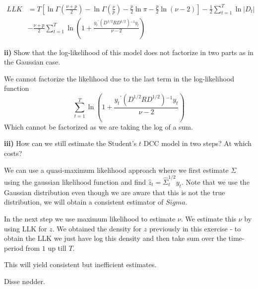 \documentclass{article}
\begin{document}
\begin{align*}
    LLK&=T\left[\ln\Gamma\left(\frac{\nu+p}{2}\right)-\ln\Gamma\left(\frac{\nu}{p}\right)-\frac{p}{2}\ln\pi-\frac{p}{2}\ln\left(\nu-2\right)\right]-\frac{1}{2}\sum_{t=1}^{T}\ln\left|D_{t}\right|\\
	&-\frac{\nu+p}{2}\sum_{t=1}^{T}\ln\left(1+\frac{y_{t}{}^{\prime}\left(D^{1/2}RD^{1/2}\right){}^{-1}y_{t}}{\nu-2}\right)
\end{align*}

\begin{tcolorbox}[colback=white]
	\textbf{ii)} Show that the log-likelihood of this model does not factorize in two parts as in the Gaussian case.
\end{tcolorbox}
We cannot factorize the likelihood due to the last term in the log-likelihood function 
$$\sum_{t=1}^{T}\ln\left(1+\frac{y_{t}{}^{\prime}\left(D^{1/2}RD^{1/2}\right){}^{-1}y_{t}}{\nu-2}\right)$$ Which cannot be factorized as we are taking the log of a sum.


\begin{tcolorbox}[colback=white]
	\textbf{iii)} How can we still estimate the Student's $t$ DCC model in two steps? At which costs? 
\end{tcolorbox}

We can use a quasi-maximum likelihood approach where we first estimate $\Sigma$ using 
the gaussian likelihood function and find $\widehat{z}_{t}=\widehat{\Sigma}_{t}^{1/2}y_{t}$. 
Note that we use the Gaussian distribution even though we are aware that this is not the true distribution, we will obtain a consistent estimator of $Sigma$. 

In the next step we use maximum likelihood to estimate $\nu$. 
We estimate this $\nu$ by using LLK for $z$. We obtained the density for $z$ previously in this exercise - to obtain the LLK we just have log this density and then take sum over the time-period from $1$ up till $T$. 


This will yield consistent but inefficient estimates.

Disse nødder.
\end{document}
